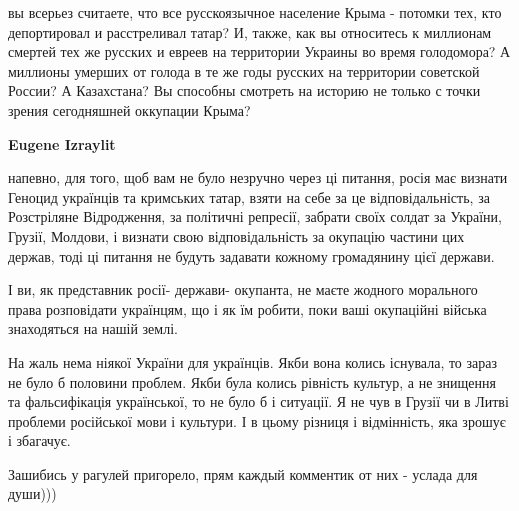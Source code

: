 \begin{itemize}
\begin{itemize}
вы всерьез считаете, что все русскоязычное население Крыма - потомки тех, кто
депортировал и расстреливал татар? И, также, как вы относитесь к миллионам
смертей тех же русских и евреев на территории Украины во время голодомора? А
миллионы умерших от голода в те же годы русских на территории советской России?
А Казахстана? Вы способны смотреть на историю не только с точки зрения
сегодняшней оккупации Крыма?


 
\textbf{Eugene Izraylit} 

напевно, для того, щоб вам не було незручно через ці питання, росія має визнати
Геноцид українців та кримських татар, взяти на себе за це відповідальність, за
Розстріляне Відродження, за політичні репресії, забрати своїх солдат за
України, Грузії, Молдови, і визнати свою відповідальність за окупацію частини
цих держав, тоді ці питання не будуть задавати кожному громадянину цієї
держави. 

І ви, як представник росії- держави- окупанта, не маєте жодного
морального права розповідати українцям, що і як їм робити, поки ваші окупаційні
війська знаходяться на нашій землі.

\end{itemize}

 

На жаль нема ніякої України для українців. Якби вона колись існувала, то зараз
не було б половини проблем. Якби була колись рівність культур, а не знищення та
фальсифікація української, то не було б і ситуації. Я не чув в Грузії чи в
Литві проблеми російської мови і культури. І в цьому різниця і відмінність, яка
зрошує і збагачує.


 

Зашибись у рагулей пригорело, прям каждый комментик от них - услада для души)))



\end{itemize}
